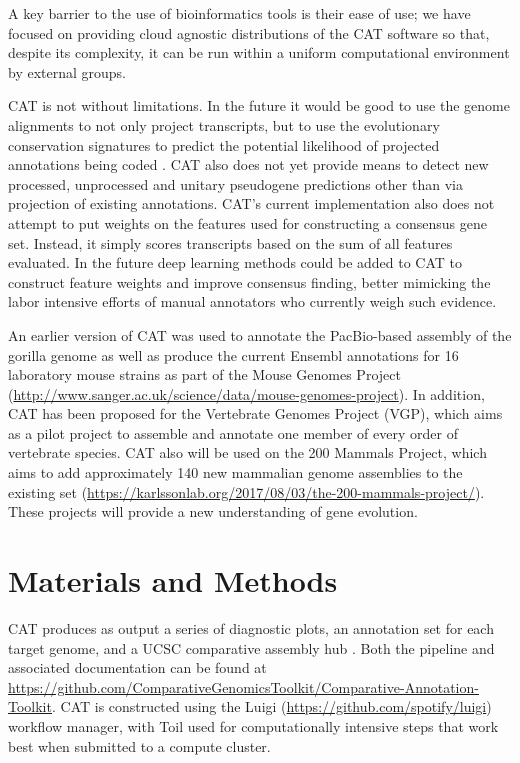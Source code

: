 \documentclass[fleqn,10pt]{wlscirep}
\begin{document}
A key barrier to the use of bioinformatics tools is their ease of use; we have focused on providing cloud agnostic distributions of the CAT software so that, despite its complexity, it can be run within a uniform computational environment by external groups. 

CAT is not without limitations. In the future it would be good to use the genome alignments to not only project transcripts, but to use the evolutionary conservation signatures to predict the potential likelihood of projected annotations being coded  \citep{lin2011phylocsf}. CAT also does not yet provide means to detect new processed, unprocessed and unitary pseudogene predictions other than via projection of existing annotations. CAT’s current implementation also does not attempt to put weights on the features used for constructing a consensus gene set. Instead, it simply scores transcripts based on the sum of all features evaluated. In the future deep learning methods could be added to CAT to construct feature weights and improve consensus finding, better mimicking the labor intensive efforts of manual annotators who currently weigh such evidence. 

An earlier version of CAT was used to annotate the PacBio-based assembly of the gorilla genome  \citep{gordon2016long} as well as produce the current Ensembl annotations for 16 laboratory mouse strains as part of the Mouse Genomes Project \citep{lilue2018multiple} (\url{http://www.sanger.ac.uk/science/data/mouse-genomes-project}). In addition, CAT has been proposed for the Vertebrate Genomes Project (VGP), which aims as a pilot project to assemble and annotate one member of every order of vertebrate species. CAT also will be used on the 200 Mammals Project, which aims to add approximately 140 new mammalian genome assemblies to the existing set (\url{https://karlssonlab.org/2017/08/03/the-200-mammals-project/}). These projects will provide a new understanding of gene evolution.

\section*{Materials and Methods}

CAT produces as output a series of diagnostic plots, an annotation set for each target genome, and a UCSC comparative assembly hub  \citep{nguyen2014comparative}. Both the pipeline and associated documentation can be found at \url{https://github.com/ComparativeGenomicsToolkit/Comparative-Annotation-Toolkit}. CAT is constructed using the Luigi (\url{https://github.com/spotify/luigi}) workflow manager, with Toil  \citep{vivian2017toil} used for computationally intensive steps that work best when submitted to a compute cluster. 
\end{document}
